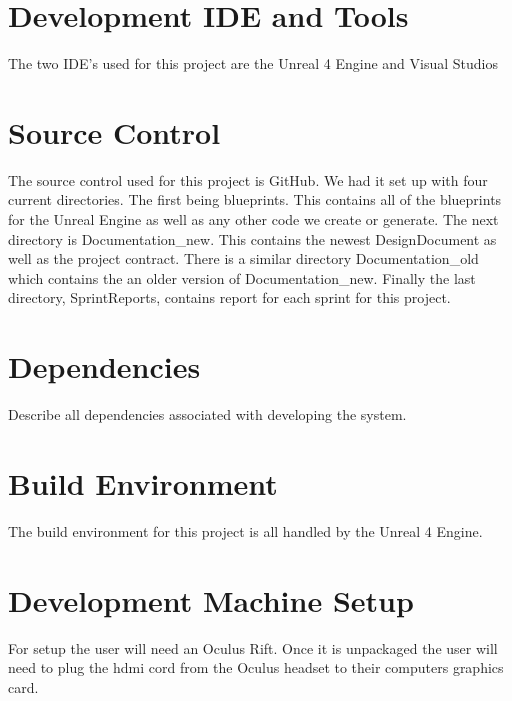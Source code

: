 \section{Development IDE and Tools}
The two IDE's used for this project are the Unreal 4 Engine and Visual Studios

\section{Source  Control}
The source control used for this project is GitHub. We had it set up with four current directories. The first being blueprints. This contains all of the blueprints for the Unreal Engine as well as any other code we create or generate. The next directory is Documentation\_new. This contains the newest DesignDocument as well as the project contract. There is a similar directory Documentation\_old which contains the an older version of  Documentation\_new. Finally the last directory, SprintReports, contains report for each sprint for this project.

\section{Dependencies}
Describe all dependencies associated with developing the system. 

\section{Build  Environment}
The build environment for this project is all handled by the Unreal 4 Engine.

\section{Development Machine Setup}
For setup the user will need an Oculus Rift. Once it is unpackaged the user will need to plug the hdmi cord from the Oculus headset to their computers graphics card. 


